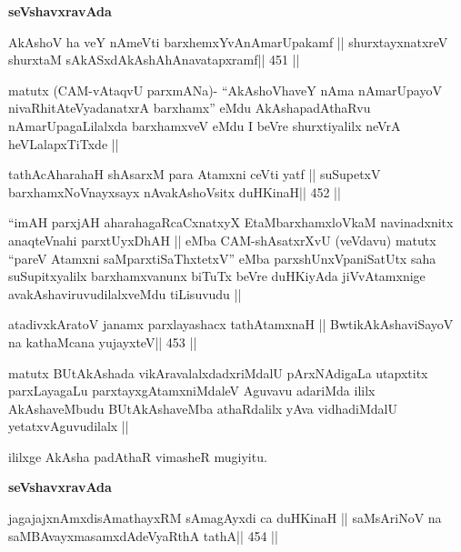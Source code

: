 \begin{center}
\textbf{seVshavxravAda}
\end{center}

\begin{shl}
AkAshoV ha veY nAmeVti barxhemxYvAnAmarUpakamf ||
shurxtayxnatxreV shurxtaM sAkASxdAkAshAhAnavatapxramf\hfill || 451 ||
\end{shl}

\begin{artha}
matutx (CAM-vAtaqvU parxmANa)- ``AkAshoVhaveY nAma nAmarUpayoV
nivaRhitAteVyadanatxrA barxhamx'' eMdu AkAshapadAthaRvu
nAmarUpagaLilalxda barxhamxveV eMdu I beVre shurxtiyalilx neVrA
heVLalapxTiTxde ||
\end{artha}

\begin{shl}
tathAcAharahaH shAsarxM para Atamxni ceVti yatf ||
suSupetxV barxhamxNoV\s nayxsayx nAvakAshoV\s sitx duHKinaH\hfill || 452 ||
\end{shl}

\begin{artha}
``imAH parxjAH aharahagaRcaCxnatxyX EtaMbarxhamxloVkaM navinadxnitx
  anaqteVnahi parxtUyxDhAH || eMba CAM-shAsatxrXvU (veVdavu) matutx
  ``pareV Atamxni saMparxtiSaThxtetxV'' eMba parxshUnxVpaniSatUtx saha
  suSupitxyalilx barxhamxvanunx biTuTx beVre duHKiyAda jiVvAtamxnige
  avakAshaviruvudilalxveMdu tiLisuvudu ||
\end{artha}

\begin{shl}
atadivxkAratoV janamx parxlayashacx tathA\s\s tamxnaH ||
BwtikAkAshaviSayoV na kathaMcana yujayxteV\hfill || 453 ||
\end{shl}

\begin{artha}
matutx BUtAkAshada vikAravalalxdadxriMdalU pArxNAdigaLa utapxtitx
parxLayagaLu parxtayxgAtamxniMdaleV Aguvavu  adariMda ililx
AkAshaveMbudu BUtAkAshaveMba athaRdalilx yAva vidhadiMdalU
yetatxvAguvudilalx ||
\end{artha}

\begin{artha}
ililxge AkAsha padAthaR vimasheR mugiyitu.
\end{artha}

\medskip
\centerline{\textbf{seVshavxravAda}}

\begin{shl}
jagajajxnAmxdisAmathayxRM sAmagAyxdi ca duHKinaH ||
saMsAriNoV na saMBAvayxmasamxdAdeVyaRthA tathA\hfill || 454 ||
\end{shl}

